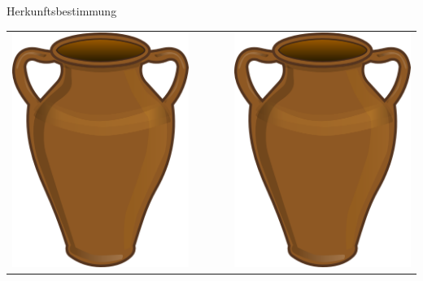 \documentclass[xcolor=dvipsnames, aspectratio=169]{beamer}
\begin{document}
\begin{frame}{Herkunftsbestimmung}
\begin{center}
\begin{tabularx}{.9\columnwidth}{rlCrl}
&&&&\\

\end{tabularx}
\end{center}
\end{frame}
\end{document}
